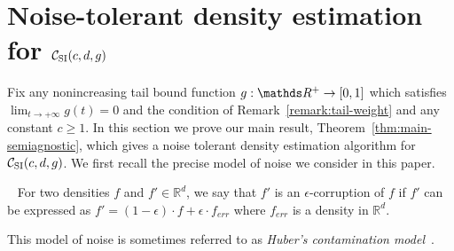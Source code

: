 
\section{Noise-tolerant density estimation for ${\mathcal C}_{\mathrm{SI}}(c,d,g)$}
\label{sec:semi-agnostic}

Fix any nonincreasing tail bound function $g: \R^+ \to [0,1]$ which satisfies $\lim_{t \to +\infty} g(t) = 0$
and the condition of Remark~\ref{remark:tail-weight}
and any constant $c \geq 1$.
In this section we prove  our main result, Theorem~\ref{thm:main-semiagnostic}, which gives a noise tolerant density estimation algorithm for
${\mathcal C}_{\mathrm{SI}}(c,d,g)$. We first recall the precise model of noise we consider in this paper. 
\begin{definition}~\label{def:corruption}
For two densities $f$ and $f' \in \mathbb{R}^d$, we say that $f'$ is an $\epsilon$-corruption of $f$ if $f'$ can be expressed as $f' = (1-\epsilon) \cdot f + \epsilon \cdot f_{err}$ where $f_{err}$ is a density in $\mathbb{R}^d$. 
\end{definition}
This model of noise is sometimes referred to as \emph{Huber's contamination model}~\citep{huber1967behavior}. 



